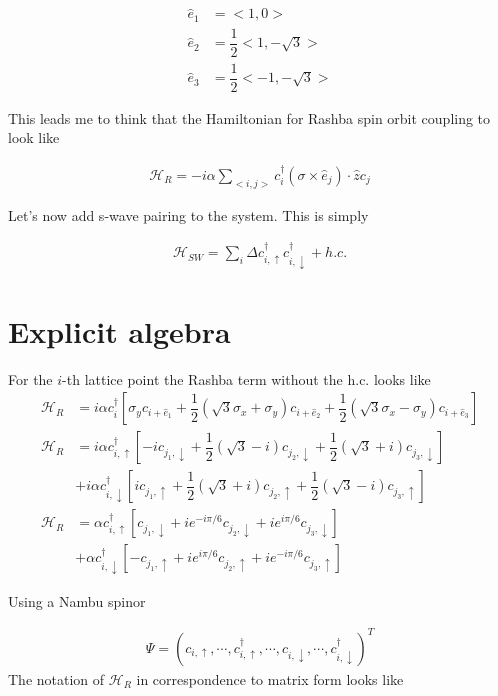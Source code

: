 \begin{align}
  \hat{e}_1 &= <1,0> \\
  \hat{e}_2 &= \dfrac{1}{2}<1,-\sqrt{3}> \\
  \hat{e}_3 &= \dfrac{1}{2}<-1,-\sqrt{3}>
\end{align}

This leads me to think that the Hamiltonian for Rashba spin orbit coupling to look like

\begin{align}
  \mathcal{H}_R = -i\alpha\sum_{<i,j>} c^{\dagger}_i (\sigma \times \hat{e}_j)\cdot \hat{z} c_j
\end{align}

Let's now add s-wave pairing to the system. This is simply

\begin{align}
  \mathcal{H}_{SW} = \sum\limits_i \Delta c^{\dagger}_{i,\uparrow} c^{\dagger}_{i,\downarrow} + h.c.
\end{align}

\section{Explicit algebra}

For the $i$-th lattice point the Rashba term without the h.c. looks like
\begin{align}
  \mathcal{H}_R &= i\alpha c^{\dagger}_i \left[ \sigma_y c_{i+\hat{e}_1} +\dfrac{1}{2}(\sqrt{3}\sigma_x +\sigma_y) c_{i+\hat{e}_2}+\dfrac{1}{2}(\sqrt{3}\sigma_x -\sigma_y) c_{i+\hat{e}_3}\right] \\
  \mathcal{H}_R &= i\alpha c^{\dagger}_{i,\uparrow} \left[ -i c_{j_1,\downarrow} +\dfrac{1}{2}(\sqrt{3}-i) c_{j_2,\downarrow}+\dfrac{1}{2}(\sqrt{3}+i) c_{j_3,\downarrow}\right] \\
   &+ i\alpha c^{\dagger}_{i,\downarrow} \left[ i c_{j_1,\uparrow} +\dfrac{1}{2}(\sqrt{3}+i) c_{j_2,\uparrow}+\dfrac{1}{2}(\sqrt{3}-i) c_{j_3,\uparrow}\right] \\
   \mathcal{H}_R &= \alpha c^{\dagger}_{i,\uparrow} \left[ c_{j_1,\downarrow} +ie^{-i\pi/6} c_{j_2,\downarrow}+ie^{i\pi/6} c_{j_3,\downarrow}\right] \\
   &+ \alpha c^{\dagger}_{i,\downarrow} \left[ -c_{j_1,\uparrow} +ie^{i\pi/6} c_{j_2,\uparrow}+ie^{-i\pi/6} c_{j_3,\uparrow}\right]
\end{align}

Using a Nambu spinor

\begin{align}
  \Psi = (c_{i,\uparrow}, \cdots, c^{\dagger}_{i,\uparrow}, \cdots, c_{i,\downarrow}, \cdots, c^{\dagger}_{i,\downarrow})^T
\end{align}
The notation of $\mathcal{H}_R$ in correspondence to matrix form looks like

